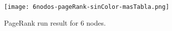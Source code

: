 	
\begin{figure}
	\centering
	\texttt{[image: 6nodos-pageRank-sinColor-masTabla.png]}
	\caption{PageRank run result for 6 nodes.} 
	\label{fig:6nodos-pageRank-sinColor-masTabla}
\end{figure}








